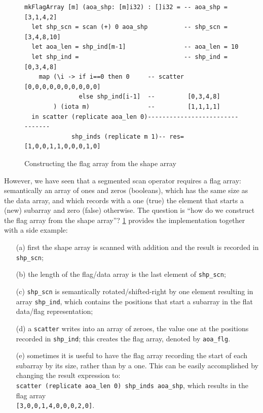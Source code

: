\documentclass[acmsmall,review]{acmart}\settopmatter{printfolios=true,printccs=false,printacmref=false}
\begin{document}
\begin{figure}
\begin{lstlisting}[mathescape=true]
mkFlagArray [m] (aoa_shp: [m]i32) : []i32 = -- aoa_shp = [3,1,4,2]
  let shp_scn = scan (+) 0 aoa_shp          -- shp_scn = [3,4,8,10]
  let aoa_len = shp_ind[m-1]                -- aoa_len = 10
  let shp_ind =                             -- shp_ind = [0,3,4,8]
    map (\i -> if i==0 then 0     -- scatter [0,0,0,0,0,0,0,0,0,0]
               else shp_ind[i-1]  --         [0,3,4,8]
        ) (iota m)                --         [1,1,1,1]
  in scatter (replicate aoa_len 0)--------------------------------
             shp_inds (replicate m 1)-- res= [1,0,0,1,1,0,0,0,1,0] 
\end{lstlisting}\vspace{-4ex}
\caption{Constructing the flag array from the shape array}
\label{fig:make-flag}
\end{figure}

However, we have seen that a segmented scan operator requires
a flag array: semantically an array of ones and zeros (booleans),  
which has the same size as the data array, and which records with
a one (true) the element that starts a (new) subarray and zero (false)
otherwise. The question is ``how do we construct the flag array from
the shape array''?  \cref{fig:make-flag} provides the implementation
together with a side example:
\begin{itemize}
    \item[(a)] first the shape array is scanned with addition and 
        the result is recorded in {\tt shp\_scn};
    \item[(b)] the length of the flag/data array is the last element
            of {\tt shp\_scn};
    \item[(c)] {\tt shp\_scn} is semantically rotated/shifted-right
            by one element resulting in array {\tt shp\_ind},
            which contains the positions that start a subarray
            in the flat data/flag representation;
    \item[(d)] a \lstinline{scatter} writes into an array of zeroes,
            the value one at the positions recorded in {\tt shp\_ind};
            this creates the flag array, denoted by {\tt aoa\_flg}.
    \item[(e)] sometimes it is useful to have the flag array
            recording the start of each subarray by its size,
            rather than by a one. This can be easily accomplished
            by changing the result expression to:\\
            \lstinline{scatter (replicate aoa_len 0) shp_inds aoa_shp},
            which results in the flag array\\
            {\tt[3,0,0,1,4,0,0,0,2,0]}.
\end{itemize}
\end{document}

